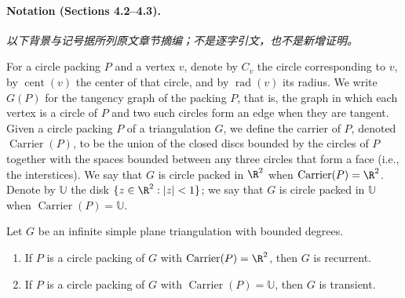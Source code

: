 \paragraph{Notation (Sections 4.2--4.3).}
\noindent\textit{以下背景与记号据所列原文章节摘编；不是逐字引文，也不是新增证明。}\par
For a circle packing $P$ and a vertex $v$, denote by $C_v$ the circle corresponding to $v$, by $\operatorname{cent}(v)$ the center of that circle, and by $\operatorname{rad}(v)$ its radius. We write $G(P)$ for the tangency graph of the packing $P$, that is, the graph in which each vertex is a circle of $P$ and two such circles form an edge when they are tangent.
Given a circle packing $P$ of a triangulation $G$, we define the carrier of $P$, denoted $\operatorname{Carrier}(P)$, to be the union of the closed discs bounded by the circles of $P$ together with the spaces bounded between any three circles that form a face (i.e., the interstices). We say that $G$ is circle packed in $\R^2$ when $\operatorname{Carrier}(P)=\R^2$. Denote by $\mathbb U$ the disk $\{z\in\R^2:|z|<1\}$; we say that $G$ is circle packed in $\mathbb U$ when $\operatorname{Carrier}(P)=\mathbb U$.

\begin{theorem}
Let $G$ be an infinite simple plane triangulation with bounded degrees.
\begin{enumerate}[label=(\arabic*),start=3]
\item If $P$ is a circle packing of $G$ with $\operatorname{Carrier}(P)=\R^2$, then $G$ is recurrent.
\item If $P$ is a circle packing of $G$ with $\operatorname{Carrier}(P)=\mathbb U$, then $G$ is transient.
\end{enumerate}
\end{theorem}

